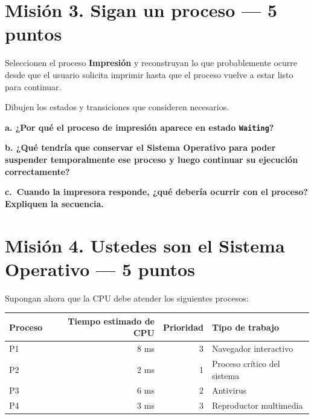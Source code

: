 \documentclass[
  spanish,
  letterpaper,
]{scrbook}
\newcounter{none} %
\begin{document}
\newpage


\chapter{Misión 3. Sigan un proceso --- 5
puntos}\label{misiuxf3n-3.-sigan-un-proceso-5-puntos}

Seleccionen el proceso \textbf{Impresión} y reconstruyan lo que
probablemente ocurre desde que el usuario solicita imprimir hasta que el
proceso vuelve a estar listo para continuar.

Dibujen los estados y transiciones que consideren necesarios.

\vspace{5cm}

\textbf{a. ¿Por qué el proceso de impresión aparece en estado
\texttt{Waiting}?}

\vspace{1.4cm}

\textbf{b. ¿Qué tendría que conservar el Sistema Operativo para poder
suspender temporalmente ese proceso y luego continuar su ejecución
correctamente?}

\vspace{1.8cm}

\textbf{c.~Cuando la impresora responde, ¿qué debería ocurrir con el
proceso? Expliquen la secuencia.}

\vspace{1.8cm}


\chapter{Misión 4. Ustedes son el Sistema Operativo --- 5
puntos}\label{misiuxf3n-4.-ustedes-son-el-sistema-operativo-5-puntos}

Supongan ahora que la CPU debe atender los siguientes procesos:

{\def\LTcaptype{none} %
\begin{longtable}[]{@{}lrrl@{}}
\toprule\noalign{}
Proceso & Tiempo estimado de CPU & Prioridad & Tipo de trabajo \\
\midrule\noalign{}
\endhead
\bottomrule\noalign{}
\endlastfoot
P1 & 8 ms & 3 & Navegador interactivo \\
P2 & 2 ms & 1 & Proceso crítico del sistema \\
P3 & 6 ms & 2 & Antivirus \\
P4 & 3 ms & 3 & Reproductor multimedia \\
\end{longtable}
}
\end{document}
